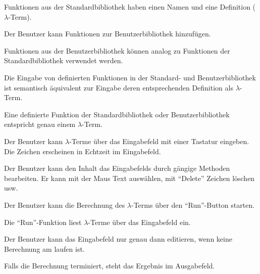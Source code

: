 \documentclass[parskip=full,11pt,twoside]{scrartcl}
\begin{document}
Funktionen aus der Standardbibliothek haben einen Namen und eine Definition ($\lambda$-Term).

Der Benutzer kann Funktionen zur Benutzerbibliothek hinzufügen.

Funktionen aus der Benutzerbibliothek können analog zu Funktionen der Standardbibliothek verwendet werden.

Die Eingabe von definierten Funktionen in der Standard- und Benutzerbibliothek ist semantisch äquivalent zur Eingabe deren entsprechenden Definition als $\lambda$-Term.

Eine definierte Funktion der Standardbibliothek oder Benutzerbibliothek entspricht genau einem $\lambda$-Term.

Der Benutzer kann $\lambda$-Terme über das Eingabefeld mit einer Tastatur eingeben. Die Zeichen erscheinen in Echtzeit im Eingabefeld.

Der Benutzer kann den Inhalt das Eingabefelds durch gängige Methoden bearbeiten.
Er kann mit der Maus Text auswählen, mit \enquote{Delete} Zeichen löschen usw.

Der Benutzer kann die Berechnung des $\lambda$-Terms über den \enquote{Run}-Button starten.

Die \enquote{Run}-Funktion liest $\lambda$-Terme über das Eingabefeld ein.

Der Benutzer kann das Eingabefeld nur genau dann editieren, wenn keine Berechnung am laufen ist.

Falls die Berechnung terminiert, steht das Ergebnis im Ausgabefeld.
\end{document}
